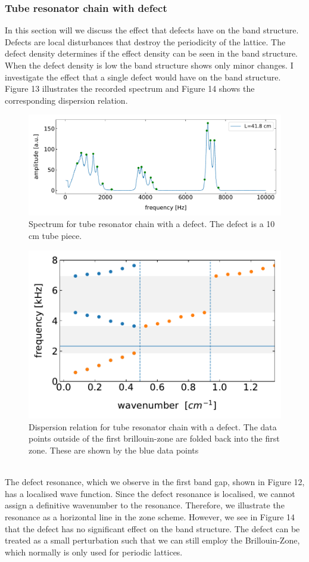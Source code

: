 \documentclass[12pt]{article}
\begin{document}
\subsubsection{Tube resonator chain with defect}
In this section will we discuss the effect that defects have on the band structure. Defects are local disturbances that destroy the periodicity of the lattice. The defect density determines if the effect density can be seen in the band structure. When the defect density is low the band structure shows only minor changes. I investigate the effect that a single defect would have on the band structure. Figure 13 illustrates the recorded spectrum and Figure 14 shows the corresponding dispersion relation.
\begin{figure}[hbt]
	\caption{Spectrum for tube resonator chain with a defect. The defect is a 10 cm tube piece.}
	\includegraphics[width=\textwidth]{results/resonances_wi_defect}	
\end{figure}
\begin{figure}[hbt]
	\caption{Dispersion relation for tube resonator chain with a defect. The data points outside of the first brillouin-zone are folded back into the first zone. These are shown by the blue data points}
	\includegraphics[width=.7\textwidth]{results/zone_with_defect}
\end{figure}
\\
The defect resonance, which we observe in the first band gap, shown in Figure 12, has a localised wave function. Since the defect resonance is localised, we cannot assign a definitive wavenumber to the resonance. Therefore, we illustrate the resonance as a horizontal line in the zone scheme. However, we see in Figure 14 that the defect has no significant effect on the band structure. The defect can be treated as a small perturbation such that we can still employ the Brillouin-Zone, which normally is only used for periodic lattices. 
\end{document}
